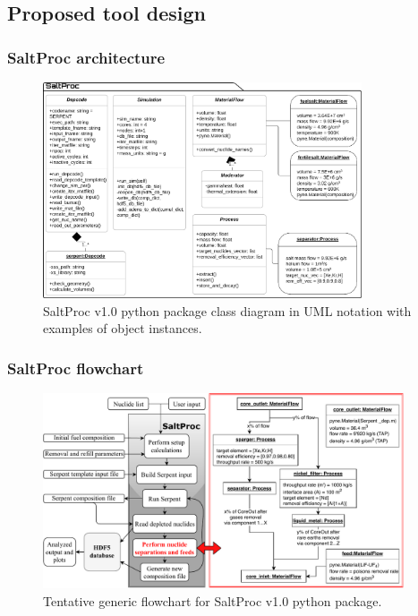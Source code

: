 \subsection{Proposed tool design}


\begin{frame}
\frametitle{SaltProc architecture}
\vspace{-2mm}
\begin{figure}[ht!] %
	\includegraphics[width=0.84\textwidth]{../figures/saltproc_class_diagram.png}
	\caption{SaltProc v1.0 python package class diagram in UML notation 
		with examples of object instances.}
\end{figure}

\end{frame}


\begin{frame}
\frametitle{SaltProc flowchart}
\vspace{-2mm}
\begin{figure}[ht!] %
	\centering
	\includegraphics[width=0.95\textwidth]{../figures/saltproc_flowchart.pdf}
	\caption{Tentative generic flowchart for SaltProc v1.0 python package.}
\end{figure}

\end{frame}